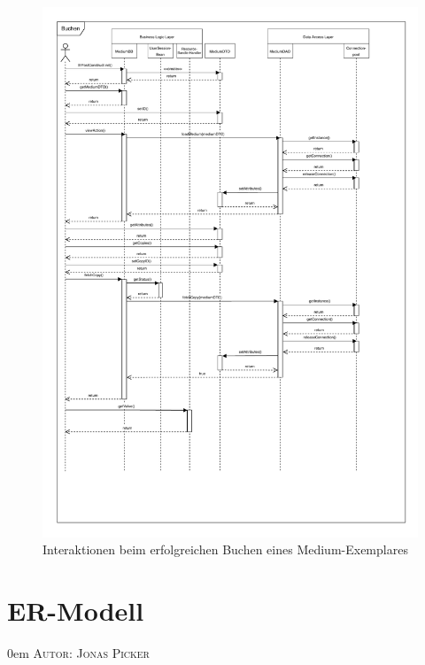 \documentclass{article}
\makeatletter
\newcommand{\sectionauthor}[1]{
	{\parindent 0em \large \scshape Autor: #1 \par \nobreak \vspace*{1em}}
	\@afterheading
}
\makeatother
\begin{document}

\begin{figure}[h]
    \centering
    \includegraphics[width = 50em]{Sequenzdiagramm-success}
    \caption{Interaktionen beim erfolgreichen Buchen eines Medium-Exemplares}
    \label{Sequenzdiagramm}
\end{figure}

\restoregeometry
\newpage


\section{ER-Modell}
\sectionauthor{Jonas Picker}
\end{document}

